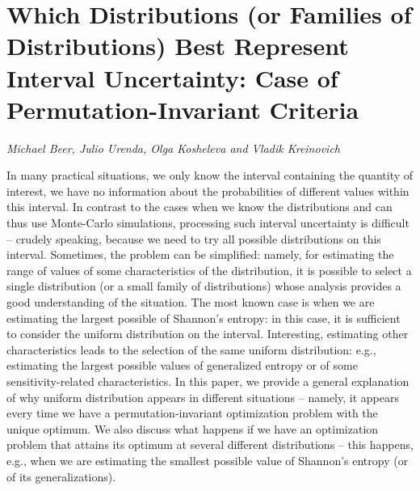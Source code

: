 \documentclass[../booklet.tex]{subfiles}
\begin{document}
\section[Which Distributions (or Families of Distributions) Best Represent Interval Uncertainty: Case of Permutation-Invariant Criteria. {\it Michael Beer, Julio Urenda, Olga Kosheleva and Vladik Kreinovich}]{Which Distributions (or Families of Distributions) Best Represent Interval Uncertainty: Case of Permutation-Invariant Criteria}
   

\begin{center}
  {\it Michael Beer, Julio Urenda, Olga Kosheleva and Vladik Kreinovich}
\end{center}

\vskip 0.8cm


In many practical situations, we only know the interval containing
the quantity of interest, we have no information about the
probabilities of different values within this interval. In contrast
to the cases when we know the distributions and can thus use
Monte-Carlo simulations, processing such interval uncertainty is
difficult -- crudely speaking, because we need to try all possible
distributions on this interval. Sometimes, the problem can be
simplified: namely, for estimating the range of values of some characteristics of the distribution,
it is possible to select a single distribution
(or a small family of distributions) whose analysis provides a good
understanding of the situation. The most known case is when we are estimating the largest possible of Shannon's entropy: in this case, it is sufficient to consider the uniform distribution on
the interval. Interesting, estimating other characteristics leads to the selection of the same
uniform distribution: e.g., estimating the largest possible values of generalized entropy or of some sensitivity-related characteristics. 
In this paper, we provide a general
explanation of why uniform distribution appears in different
situations -- namely, it appears every time we have a
permutation-invariant optimization problem with the unique optimum.
We also discuss what happens if we have an optimization problem that attains its optimum at several 
different distributions -- this happens, e.g., when we are estimating the smallest possible 
value of Shannon's entropy (or of its generalizations).
\end{document}

